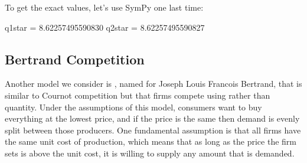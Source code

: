 \documentclass[letterpaper,10pt,english]{jupyterBook}
\begin{document}
\noindent{}

\sphinxAtStartPar
To get the exact values, let’s use SymPy one last time:

\begin{sphinxVerbatim}[commandchars=\\\{\}]
  
      
      

   
   
\end{sphinxVerbatim}

\begin{sphinxVerbatim}[commandchars=\\\{\}]
q\PYGZus{}1\PYGZus{}star = 8.62257495590830
q\PYGZus{}2\PYGZus{}star = 8.62257495590827
\end{sphinxVerbatim}


\subsection{Bertrand Competition}
\label{\detokenize{content/07-game-theory/bertrand:bertrand-competition}}\label{\detokenize{content/07-game-theory/bertrand::doc}}
\sphinxAtStartPar
Another model we consider is , named for Joseph Louis Francois Bertrand, that is similar to Cournot competition but that firms compete using  rather than quantity. Under the assumptions of this model, consumers want to buy everything at the lowest price, and if the price is the same then demand is evenly split between those producers. One fundamental assumption is that all firms have the same unit cost of production, which means that as long as the price the firm sets is above the unit cost, it is willing to supply any amount that is demanded.
\end{document}
